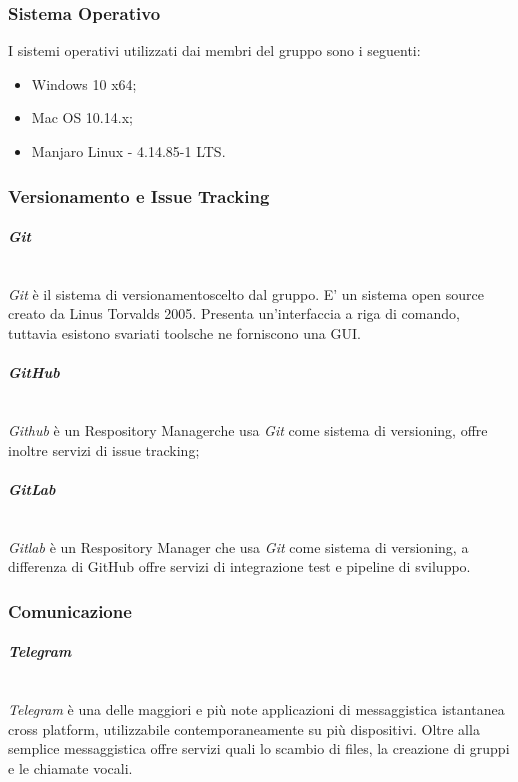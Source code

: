 \subsubsection{Sistema Operativo}
	I sistemi operativi utilizzati dai membri del gruppo sono i seguenti:
	\begin{itemize}
	\item Windows 10 x64;
	\item Mac OS 10.14.x;
	\item Manjaro Linux - 4.14.85-1 LTS.
	\end{itemize}

\subsubsection{Versionamento e Issue Tracking}

\paragraph{\textit{Git}} ~\\
	\textit{Git} è il sistema di versionamento\glossario scelto dal gruppo. E' un sistema open source creato da Linus 	Torvalds 2005. Presenta un'interfaccia a riga di comando, tuttavia esistono svariati tools\glossario 	che 	ne forniscono una GUI.

\paragraph{\textit{GitHub}} ~\\
	\textit{Github} è un Respository Manager\glossario che usa \textit{Git} come sistema di versioning, offre inoltre 	servizi di issue tracking\glossario;
	
\paragraph{\textit{GitLab}} \-\\
	\textit{Gitlab} è un Respository Manager che usa \textit{Git} come sistema di versioning, a differenza di GitHub offre servizi di integrazione test e pipeline di sviluppo. 

\subsubsection{Comunicazione}

\paragraph{\textit{Telegram}} ~\\
	\textit{Telegram} è una delle maggiori e più note applicazioni di messaggistica istantanea cross platform, 					utilizzabile contemporaneamente su più dispositivi. Oltre alla semplice messaggistica offre servizi quali lo 				scambio di files, la creazione di gruppi e le chiamate vocali.

